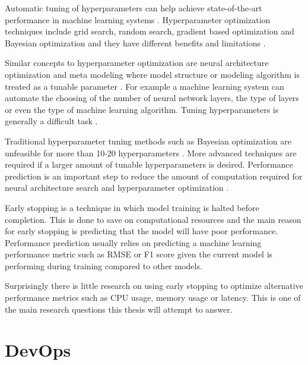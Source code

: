 Automatic tuning of hyperparameters can help achieve state-of-the-art performance in machine learning systems \parencite{maclaurinGradientbasedHyperparameterOptimization2015}.
Hyperparameter optimization techniques include grid search, random search, gradient based optimization and Bayesian optimization and they have different benefits and limitations \parencite{yangHyperparameterOptimizationMachine2020}.

Similar concepts to hyperparameter optimization are neural architecture optimization and meta modeling where model structure or modeling algorithm is treated as a tunable parameter \parencite{bakerAcceleratingNeuralArchitecture2017}.
For example a machine learning system can automate the choosing of the number of neural network layers, the type of layers or even the type of machine learning algorithm.
Tuning hyperparameters is generally a difficult task \parencite{maclaurinGradientbasedHyperparameterOptimization2015}.

Traditional hyperparameter tuning methods such as Bayesian optimization are unfeasible for more than 10-20 hyperparameters \parencite{maclaurinGradientbasedHyperparameterOptimization2015}.
More advanced techniques are required if a larger amount of tunable hyperparameters is desired.
Performance prediction is an important step to reduce the amount of computation required for neural architecture search and hyperparameter optimization \parencite{bakerAcceleratingNeuralArchitecture2017}.

Early stopping is a technique in which model training is halted before completion. %
This is done to save on computational resources and the main reason for early stopping is predicting that the model will have poor performance. %
Performance prediction usually relies on predicting a machine learning performance metric such as RMSE or F1 score given the current model is performing during training compared to other models. %

Surprisingly there is little research on using early stopping to optimize alternative performance metrics such as CPU usage, memory usage or latency. This is one of the main research questions this thesis will attempt to answer. %

\section{DevOps} %
\label{sec:devops}

